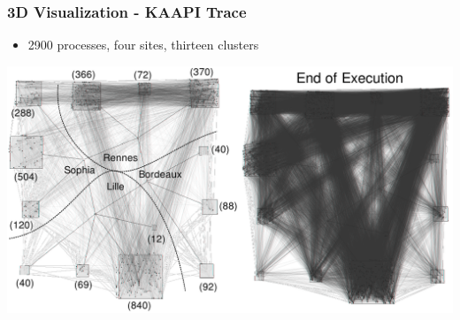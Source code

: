 \frame
{
   \frametitle{3D Visualization - KAAPI Trace}
   \begin{itemize}
   \item 2900 processes, four sites, thirteen clusters
   \end{itemize}

   \vfill
   \hspace{-1cm}
   \begin{minipage}{\textwidth}
   \includegraphics[width=1.15\textwidth]{img/scenario-3d-E.pdf}
   \end{minipage}
}
